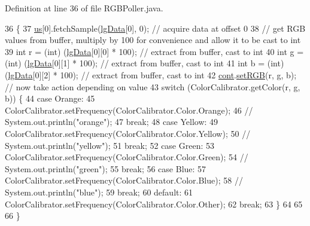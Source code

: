 Definition at line 36 of file R\+G\+B\+Poller.\+java.


\begin{DoxyCode}
36                              \{
37     \hyperlink{classca_1_1mcgill_1_1ecse211_1_1threads_1_1_light_poller_ab6a9cb770bbf71f586697633db1475ff}{us}[0].fetchSample(\hyperlink{classca_1_1mcgill_1_1ecse211_1_1threads_1_1_light_poller_a6cf53aecc3efc481f71d36341d2276c6}{lgData}[0], 0); \textcolor{comment}{// acquire data at offset 0}
38     \textcolor{comment}{// get RGB values from buffer, multiply by 100 for convenience and allow it to be cast to int}
39     \textcolor{keywordtype}{int} r = (int) (\hyperlink{classca_1_1mcgill_1_1ecse211_1_1threads_1_1_light_poller_a6cf53aecc3efc481f71d36341d2276c6}{lgData}[0][0] * 100); \textcolor{comment}{// extract from buffer, cast to int}
40     \textcolor{keywordtype}{int} g = (int) (\hyperlink{classca_1_1mcgill_1_1ecse211_1_1threads_1_1_light_poller_a6cf53aecc3efc481f71d36341d2276c6}{lgData}[0][1] * 100); \textcolor{comment}{// extract from buffer, cast to int}
41     \textcolor{keywordtype}{int} b = (int) (\hyperlink{classca_1_1mcgill_1_1ecse211_1_1threads_1_1_light_poller_a6cf53aecc3efc481f71d36341d2276c6}{lgData}[0][2] * 100); \textcolor{comment}{// extract from buffer, cast to int}
42     \hyperlink{classca_1_1mcgill_1_1ecse211_1_1threads_1_1_light_poller_ab6a9050ced4f6940add4735c8872194a}{cont}.\hyperlink{classca_1_1mcgill_1_1ecse211_1_1threads_1_1_sensor_data_a6ad23111ecd378099f0b4ed0b6d398bc}{setRGB}(r, g, b); \textcolor{comment}{// now take action depending on value}
43     \textcolor{keywordflow}{switch} (ColorCalibrator.getColor(r, g, b)) \{
44       \textcolor{keywordflow}{case} Orange:
45         ColorCalibrator.setFrequency(ColorCalibrator.Color.Orange);
46     \textcolor{comment}{//    System.out.println("orange");}
47         \textcolor{keywordflow}{break};
48       \textcolor{keywordflow}{case} Yellow:
49         ColorCalibrator.setFrequency(ColorCalibrator.Color.Yellow);
50      \textcolor{comment}{//   System.out.println("yellow");}
51         \textcolor{keywordflow}{break};
52       \textcolor{keywordflow}{case} Green:
53         ColorCalibrator.setFrequency(ColorCalibrator.Color.Green);
54      \textcolor{comment}{//   System.out.println("green");}
55         \textcolor{keywordflow}{break};
56       \textcolor{keywordflow}{case} Blue:
57         ColorCalibrator.setFrequency(ColorCalibrator.Color.Blue);
58     \textcolor{comment}{//    System.out.println("blue");}
59         \textcolor{keywordflow}{break};
60       \textcolor{keywordflow}{default}:
61         ColorCalibrator.setFrequency(ColorCalibrator.Color.Other);
62         \textcolor{keywordflow}{break};
63     \}
64     
65     
66   \}
\end{DoxyCode}
